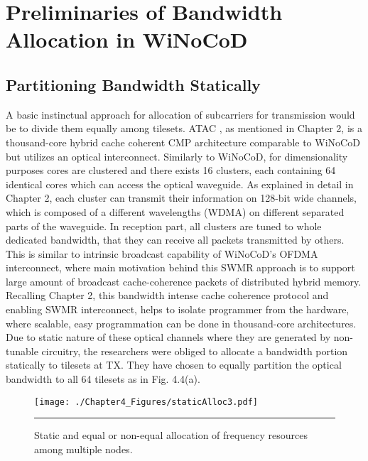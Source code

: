 \section{Preliminaries of Bandwidth Allocation in WiNoCoD}

\subsection{Partitioning Bandwidth Statically}

A basic instinctual approach for allocation of subcarriers for transmission would be to divide them equally among tilesets. ATAC \cite{kurian2010atac}, as mentioned in Chapter 2, is a thousand-core hybrid cache coherent CMP architecture comparable to WiNoCoD but utilizes an optical interconnect. Similarly to WiNoCoD, for dimensionality purposes cores are clustered and there exists 16 clusters, each containing 64 identical cores which can access the optical waveguide. As explained in detail in Chapter 2, each cluster can transmit their information on 128-bit wide channels, which is composed of a different wavelengths (WDMA) on different separated parts of the waveguide. In reception part, all clusters are tuned to whole dedicated bandwidth, that they can receive all packets transmitted by others. This is similar to intrinsic broadcast capability of WiNoCoD's OFDMA interconnect, where main motivation behind this SWMR approach is to support large amount of broadcast cache-coherence packets of distributed hybrid memory. Recalling Chapter 2, this bandwidth intense cache coherence protocol and enabling SWMR interconnect, helps to isolate programmer from the hardware, where scalable, easy programmation can be done in thousand-core architectures. Due to static nature of these optical channels where they are generated by non-tunable circuitry, the researchers were obliged to allocate a bandwidth portion statically to tilesets at TX. They have chosen to equally partition the optical bandwidth to all 64 tilesets as in Fig. 4.4(a). 

\begin{figure}[htbp]
  \centering
    \texttt{[image: ./Chapter4\_Figures/staticAlloc3.pdf]}
    \rule{35em}{0.5pt}
  \caption[Static and equal or non-equal allocation of frequency resources among multiple nodes.]{Static and equal or non-equal allocation of frequency resources among multiple nodes.} 
  \label{fig:FlitsAndRB}
\end{figure}

